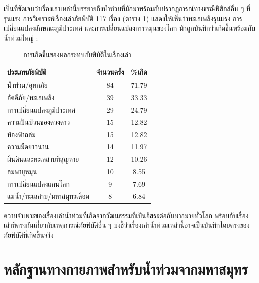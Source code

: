 \documentclass[10pt,twocolumn,letterpaper]{article}
\begin{document}
เป็นที่ชัดเจนว่าเรื่องเล่าเหล่านี้บรรยายถึงน้ำท่วมที่มักมาพร้อมกับปรากฏการณ์ทางธรณีฟิสิกส์อื่น ๆ ที่รุนแรง การวิเคราะห์เรื่องเล่าภัยพิบัติ 117 เรื่อง (ตาราง \ref{tab: 1}) แสดงให้เห็นว่าทะเลเพลิงรุนแรง การเปลี่ยนแปลงลักษณะภูมิประเทศ และการเปลี่ยนแปลงการหมุนของโลก มักถูกบันทึกว่าเกิดขึ้นพร้อมกับน้ำท่วมใหญ่ \cite{14}:

\begin{table}[ht]
\begin{center}
\renewcommand{\arraystretch}{1.2}  %
\begin{tabular}{|l|c|c|}
\hline
\textbf{ประเภทภัยพิบัติ} & \textbf{จำนวนครั้ง} & \textbf{\%เกิด} \\
\hline\hline
น้ำท่วม/อุทกภัย            & 84 & 71.79 \\
อัคคีภัย/ทะเลเพลิง     & 39 & 33.33 \\
การเปลี่ยนแปลงภูมิประเทศ   & 29 & 24.79 \\
ความปั่นป่วนของดวงดาว     & 15 & 12.82 \\
ท้องฟ้าถล่ม              & 15 & 12.82 \\
ความมืดยาวนาน           & 14 & 11.97 \\
ผืนดินและทะเลสาบที่สูญหาย  & 12 & 10.26 \\
ลมพายุหมุน              & 10 & 8.55  \\
การเปลี่ยนแปลงแกนโลก & 9 & 7.69  \\
แม่น้ำ/ทะเลสาบ/มหาสมุทรเดือด & 8 & 6.84 \\
\hline
\end{tabular}
\end{center}
\caption{การเกิดขึ้นของผลกระทบภัยพิบัติในเรื่องเล่า}
\label{tab: 1}
\end{table}

 ความจำเพาะของเรื่องเล่าน้ำท่วมที่เกิดจากวัฒนธรรมที่เป็นอิสระต่อกันมากมายทั่วโลก พร้อมกับเรื่องเล่าที่ตรงกันเกี่ยวกับเหตุการณ์ภัยพิบัติอื่น ๆ บ่งชี้ว่าเรื่องเล่าน้ำท่วมเหล่านี้อาจเป็นบันทึกโดยตรงของภัยพิบัติที่เกิดขึ้นจริง

\section{หลักฐานทางกายภาพสำหรับน้ำท่วมจากมหาสมุทร}
\end{document}
